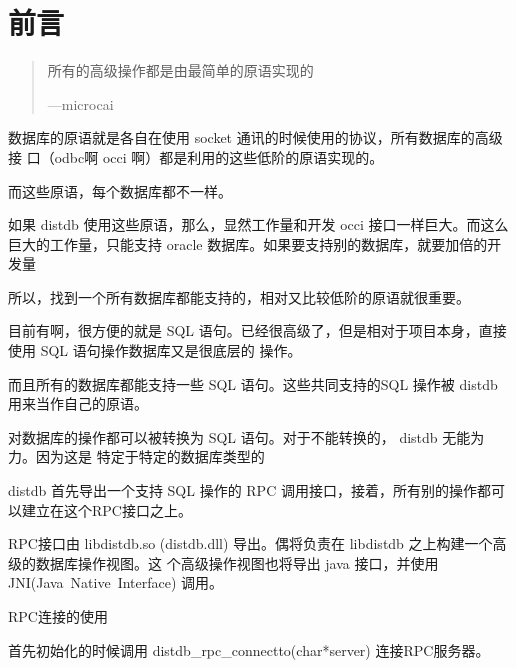 \documentclass[12pt,a4papper]{report}
\newcommand{\code}[1]{  {\noindent\CODEFONT \mbox{#1}}  }
\begin{document}

\chapter*{前言}

\begin{quote}
所有的高级操作都是由最简单的原语实现的\\
\begin{flushright}
{\CODEFONT \mbox{---microcai}}
\end{flushright}
\end{quote}

数据库的原语就是各自在使用 socket 通讯的时候使用的协议，所有数据库的高级接
口（odbc啊 occi 啊）都是利用的这些低阶的原语实现的。

而这些原语，每个数据库都不一样。

如果 \code{distdb} 使用这些原语，那么，显然工作量和开发 occi 接口一样巨大。而这么巨大的工作量，只能支持\code{oracle}
数据库。如果要支持别的数据库，就要加倍的开发量

所以，找到一个所有数据库都能支持的，相对又比较低阶的原语就很重要。

目前有啊，很方便的就是 SQL 语句。已经很高级了，但是相对于项目本身，直接使用 SQL 语句操作数据库又是很底层的
操作。

而且所有的数据库都能支持一些 SQL 语句。这些共同支持的SQL 操作被 \code{distdb} 用来当作自己的原语。

对数据库的操作都可以被转换为 SQL 语句。对于不能转换的，\code{distdb} 无能为力。因为这是 特定于特定的数据库类型的

\code{distdb} 首先导出一个支持 SQL 操作的 RPC 调用接口，接着，所有别的操作都可以建立在这个RPC接口之上。

RPC接口由 libdistdb.so (distdb.dll) 导出。偶将负责在 libdistdb 之上构建一个高级的数据库操作视图。这
个高级操作视图也将导出 java 接口，并使用 \code{JNI(Java Native Interface)} 调用。


RPC连接的使用　

首先初始化的时候调用 \code{distdb\_rpc\_connectto(char*server)}连接RPC服务器。
\end{document}
